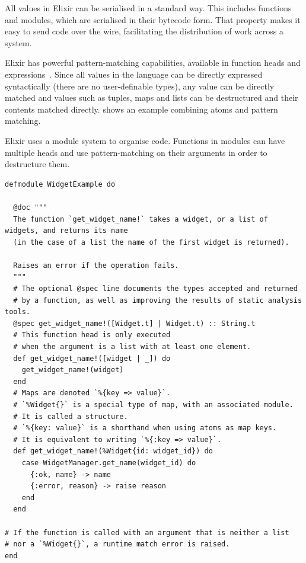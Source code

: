 All values in Elixir can be serialised in a standard way.
This includes functions and modules, which are serialised in their bytecode form.
That property makes it easy to send code over the wire, facilitating the distribution of work across a system.

Elixir has powerful pattern-matching capabilities, available in function heads and  expressions~\cite[p.~13]{Thomas:2016}.
Since all values in the language can be directly expressed syntactically (there are no user-definable types), any value can be directly matched and values such as tuples, maps and lists can be destructured and their contents matched directly.
 shows an example combining atoms and pattern matching.

\begin{listing}[h]
	\caption[An example Elixir module, showcasing pattern-matching.]{Elixir uses a module system to organise code. Functions in modules can have multiple heads and use pattern-matching on their arguments in order to destructure them.}
	\label{lst:prep:pattern-matching-example}
	\begin{verbatim}
defmodule WidgetExample do

  @doc """
  The function `get_widget_name!` takes a widget, or a list of widgets, and returns its name
  (in the case of a list the name of the first widget is returned).

  Raises an error if the operation fails. 
  """
  # The optional @spec line documents the types accepted and returned
  # by a function, as well as improving the results of static analysis tools. 
  @spec get_widget_name!([Widget.t] | Widget.t) :: String.t
  # This function head is only executed
  # when the argument is a list with at least one element.
  def get_widget_name!([widget | _]) do
    get_widget_name!(widget)
  end
  # Maps are denoted `%{key => value}`.
  # `%Widget{}` is a special type of map, with an associated module.
  # It is called a structure.
  # `%{key: value}` is a shorthand when using atoms as map keys.
  # It is equivalent to writing `%{:key => value}`.  
  def get_widget_name!(%Widget{id: widget_id}) do
    case WidgetManager.get_name(widget_id) do
      {:ok, name} -> name
      {:error, reason} -> raise reason
    end
  end

# If the function is called with an argument that is neither a list
# nor a `%Widget{}`, a runtime match error is raised.
end
	\end{verbatim}
\end{listing}

